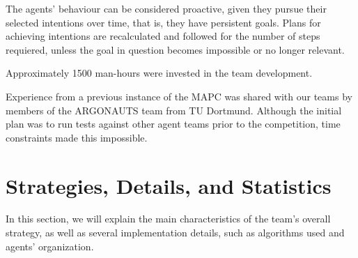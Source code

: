 \documentclass{llncs2e/llncs}
\begin{document}
    The agents' behaviour can be considered proactive, given they pursue their 
    selected intentions over time, that is, they have persistent goals. Plans 
    for achieving intentions are recalculated and followed for the number of
    steps requiered, unless the goal in question becomes impossible or no longer
    relevant.

    Approximately 1500 man-hours were invested in the team development.

    Experience from a previous instance of the MAPC was shared with our teams by
    members of the ARGONAUTS team from TU Dortmund\cite{Holzgen:2011}. Although
    the initial plan was to run tests against other agent teams prior to the
    competition, time constraints made this impossible.



\section{Strategies, Details, and Statistics}

    
    In this section, we will explain the main characteristics of the team's 
	overall strategy, as well as several implementation details, such as 
	algorithms used and agents' organization.
\end{document}
